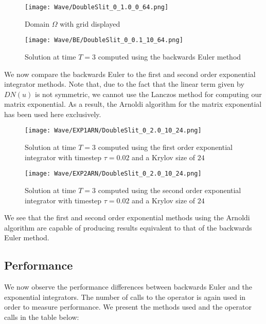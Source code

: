 \begin{figure}[H]
    \centering
    \begin{minipage}{0.49\textwidth}
        \texttt{[image: Wave/DoubleSlit\_0\_1.0\_0\_64.png]} %
        \caption{Domain $\Omega$ with grid displayed}
        \label{fig:waveOmega}
    \end{minipage}\hfill
    \centering
    \begin{minipage}{0.49\textwidth}
        \texttt{[image: Wave/BE/DoubleSlit\_0\_0.1\_10\_64.png]} %
        \caption{Solution at time $T=3$ computed using the backwards Euler method}
        \label{fig:second order 32}
    \end{minipage}\hfill
\end{figure}

We now compare the backwards Euler to the first and second order exponential integrator methods.
Note that, due to the fact that the linear term given by $DN(u)$ is not symmetric, we cannot use the Lanczos method for computing our matrix exponential.
As a result, the Arnoldi algorithm for the matrix exponential has been used here exclusively.
\begin{figure}[H]
    \centering
    \begin{minipage}{0.49\textwidth}
        \texttt{[image: Wave/EXP1ARN/DoubleSlit\_0\_2.0\_10\_24.png]} %
        \caption{Solution at time $T=3$ computed using the first order exponential integrator with timestep $\tau = 0.02$ and a Krylov size of $24$}
        \label{fig:second order 16}
    \end{minipage}\hfill
    \centering
    \begin{minipage}{0.49\textwidth}
        \texttt{[image: Wave/EXP2ARN/DoubleSlit\_0\_2.0\_10\_24.png]} %
        \caption{Solution at time $T=3$ computed using the second order exponential integrator with timestep $\tau = 0.02$ and a Krylov size of $24$}
        \label{fig:second order 32}
    \end{minipage}\hfill
\end{figure}

We see that the first and second order exponential methods using the Arnoldi algorithm are capable of producing results equivalent to that of the backwards Euler method.

\subsection{Performance}
We now observe the performance differences between backwards Euler and the exponential integrators.
The number of calls to the operator is again used in order to measure performance.
We present the methods used and the operator calls in the table below:

